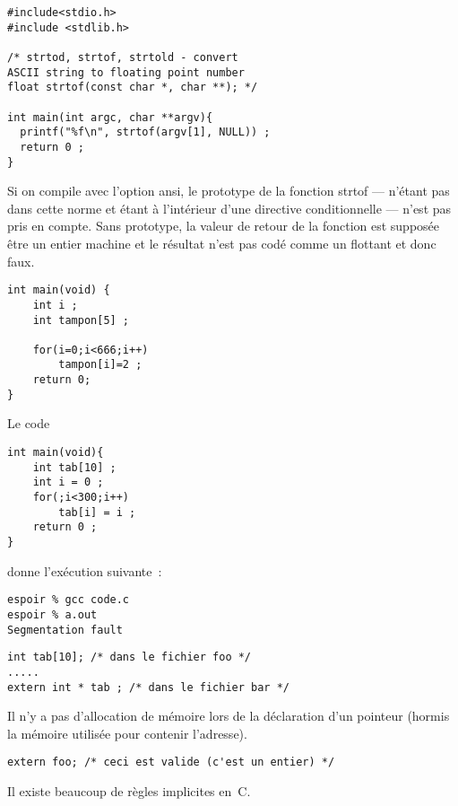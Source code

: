 \begin{frame}[fragile]
\begin{verbatim}
#include<stdio.h>
#include <stdlib.h>
 
/* strtod, strtof, strtold - convert 
ASCII string to floating point number
float strtof(const char *, char **); */

int main(int argc, char **argv){
  printf("%f\n", strtof(argv[1], NULL)) ;  
  return 0 ;
}
\end{verbatim}
  Si on compile avec l'option ansi, le prototype de la fonction strtof
  --- n'\'etant pas dans cette norme et \'etant \`a l'int\'erieur
  d'une directive conditionnelle --- n'est pas pris en compte.  Sans
  prototype, la valeur de retour de la fonction est suppos\'ee \^etre
  un entier machine et le r\'esultat n'est pas cod\'e comme un
  flottant et donc faux.
\end{frame}
\begin{frame}[fragile]
\begin{verbatim}
int main(void) {
	int i ;
	int tampon[5] ;

	for(i=0;i<666;i++)
		tampon[i]=2 ;
	return 0;
}
\end{verbatim}
\end{frame}
\begin{frame}[fragile]
Le code
\begin{verbatim}
int main(void){
    int tab[10] ;
    int i = 0 ;
    for(;i<300;i++) 
        tab[i] = i ;
    return 0 ;
}
\end{verbatim}
donne l'ex\'ecution suivante~:
\begin{verbatim}
espoir % gcc code.c 
espoir % a.out
Segmentation fault
\end{verbatim}  
\end{frame}
\begin{frame}[fragile]
\begin{verbatim}
int tab[10]; /* dans le fichier foo */
.....
extern int * tab ; /* dans le fichier bar */
\end{verbatim}
Il n'y a pas d'allocation de m\'emoire lors de la d\'eclaration d'un
pointeur (hormis la m\'emoire utilis\'ee pour contenir l'adresse).
\begin{verbatim}
extern foo; /* ceci est valide (c'est un entier) */
\end{verbatim}
Il existe beaucoup de r\`egles implicites en~C.
\end{frame}
